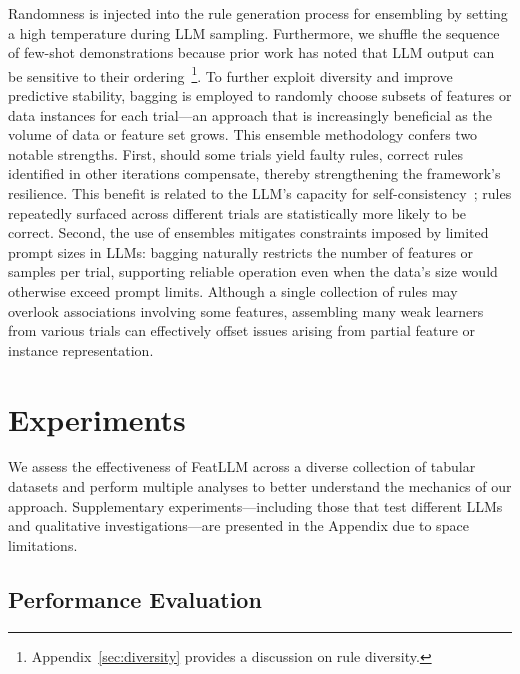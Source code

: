 Randomness is injected into the rule generation process for ensembling by setting a high temperature during LLM sampling. Furthermore, we shuffle the sequence of few-shot demonstrations because prior work has noted that LLM output can be sensitive to their ordering~\cite{lu2022fantastically}\footnote{Appendix~\ref{sec:diversity} provides a discussion on rule diversity.}. To further exploit diversity and improve predictive stability, bagging is employed to randomly choose subsets of features or data instances for each trial—an approach that is increasingly beneficial as the volume of data or feature set grows. This ensemble methodology confers two notable strengths. First, should some trials yield faulty rules, correct rules identified in other iterations compensate, thereby strengthening the framework's resilience. This benefit is related to the LLM's capacity for self-consistency~\cite{wang2022self}; rules repeatedly surfaced across different trials are statistically more likely to be correct. Second, the use of ensembles mitigates constraints imposed by limited prompt sizes in LLMs: bagging naturally restricts the number of features or samples per trial, supporting reliable operation even when the data's size would otherwise exceed prompt limits. Although a single collection of rules may overlook associations involving some features, assembling many weak learners from various trials can effectively offset issues arising from partial feature or instance representation.

\section{Experiments}
We assess the effectiveness of \textsf{FeatLLM} across a diverse collection of tabular datasets and perform multiple analyses to better understand the mechanics of our approach. Supplementary experiments—including those that test different LLMs and qualitative investigations—are presented in the Appendix due to space limitations.

\subsection{Performance Evaluation}
